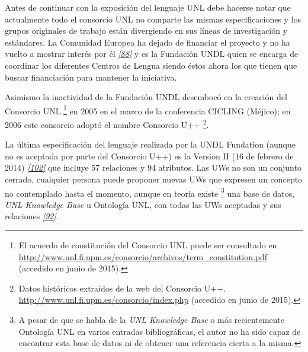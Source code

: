 \documentclass[a4paper,12pt,spanish]{book}
\begin{document}
Antes de continuar con la exposición del lenguaje UNL debe hacerse notar que actualmente todo
el consorcio UNL no comparte las mismas especificaciones y los grupos originales de trabajo
están divergiendo en sus líneas de investigación y estándares. La Comunidad Europea ha dejado
de financiar el proyecto y no ha vuelto a mostrar interés por él \label{1.state-of-the-art/i.representacion-conocimiento:id48}{\hyperref[zreferences:tovar2000]{\emph{{[}88{]}}}} y es la
Fundación UNDL quien se encarga de coordinar los diferentes Centros de Lengua siendo éstos
ahora los que tienen que buscar financiación para mantener la iniciativa.

Asimismo la inactividad de la Fundación UNDL desembocó en la creación del
Consorcio UNL \footnote{
El acuerdo de constitución del Consorcio UNL puede ser consultado en \href{http://www.unl.fi.upm.es/consorcio/archivos/term\_constitution.pdf}{http://www.unl.fi.upm.es/consorcio/archivos/term\_constitution.pdf} (accedido en junio de 2015).
} en 2005 en el marco de la conferencia CICLING (Méjico); en 2006 este
consorcio adoptó el nombre Consorcio U++ \footnote{
Datos históricos extraídos de la web del Consorcio U++. \href{http://www.unl.fi.upm.es/consorcio/index.php}{http://www.unl.fi.upm.es/consorcio/index.php} (accedido en junio de 2015).
}.

La última especificación del lenguaje realizada por la UNDL Fundation (aunque no es aceptada
por parte del Consorcio U++) es la Version II (16 de febrero de 2014) \label{1.state-of-the-art/i.representacion-conocimiento:id53}{\hyperref[zreferences:zhu2014]{\emph{{[}102{]}}}} que
incluye 57 relaciones y 94 atributos.
Las UWs no son un conjunto cerrado, cualquier persona puede proponer nuevas UWs que expresen
un concepto no contemplado hasta el momento, aunque en teoría existe \footnote{
A pesar de que se habla de la \emph{UNL Knowledge Base} o más recientemente Ontología UNL en
varios entradas bibliográficas, el autor no ha sido capaz de encontrar esta base de datos ni
de obtener una referencia cierta a la misma.
} una base de datos,
\emph{UNL Knowledge Base} u Ontología UNL, con todas las UWs aceptadas y sus
relaciones \label{1.state-of-the-art/i.representacion-conocimiento:id55}{\hyperref[zreferences:zhu2002]{\emph{{[}92{]}}}}.
\end{document}
